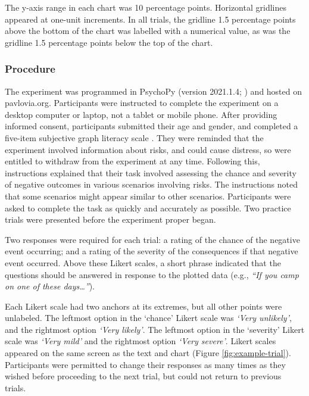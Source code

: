 \documentclass[journal]{vgtc}                %
\begin{document}
The y-axis range in each chart was 10 percentage points. Horizontal
gridlines appeared at one-unit increments. In all trials, the gridline
1.5 percentage points above the bottom of the chart was labelled with a
numerical value, as was the gridline 1.5 percentage points below the top
of the chart.

\hypertarget{procedure}{%
\subsubsection{Procedure}\label{procedure}}

The experiment was programmed in PsychoPy (version 2021.1.4; \citep{peirce_psychopy2_2019}) and hosted on
pavlovia.org. Participants were instructed to complete the experiment on
a desktop computer or laptop, not a tablet or mobile phone. After
providing informed consent, participants submitted their age and gender,
and completed a five-item subjective graph literacy scale
\citep{garcia-retamero_measuring_2016}. They were reminded that the
experiment involved information about risks, and could cause distress,
so were entitled to withdraw from the experiment at any time. Following
this, instructions explained that their task involved assessing the
chance and severity of negative outcomes in various scenarios involving
risks. The instructions noted that some scenarios might appear similar
to other scenarios. Participants were asked to complete the task as
quickly and accurately as possible. Two practice trials were presented
before the experiment proper began.

Two responses were required for each trial: a rating of the chance of
the negative event occurring; and a rating of the severity of the
consequences if that negative event occurred. Above these Likert scales,
a short phrase indicated that the questions should be answered in
response to the plotted data (e.g., \emph{``If you camp on one of these
days\ldots{}''}).

Each Likert scale had two anchors at its extremes, but all other points
were unlabeled. The leftmost option in the `chance' Likert scale was
\emph{`Very unlikely'}, and the rightmost option \emph{`Very likely'}. The
leftmost option in the `severity' Likert scale was \emph{`Very mild'} and the
rightmost option \emph{`Very severe'}. Likert scales appeared on the same
screen as the text and chart (Figure \ref{fig:example-trial}).
Participants were permitted to change their responses as many times as
they wished before proceeding to the next trial, but could not return to
previous trials.
\end{document}
